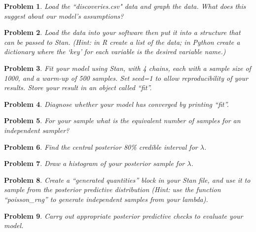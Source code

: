 \documentclass{article}
\newtheorem{problem}{Problem}[section]
\begin{document}
\begin{problem}
Load the ``discoveries.csv" data and graph the data. What does this suggest about our model's assumptions?
\end{problem}

\begin{problem}
Load the data into your software then put it into a structure that can be passed to Stan. (Hint: in R create a list of the data; in Python create a dictionary where the `key' for each variable is the desired variable name.)
\end{problem}

\begin{problem}
Fit your model using Stan, with 4 chains, each with a sample size of 1000, and a warm-up of 500 samples. Set seed=1 to allow reproducibility of your results. Store your result in an object called ``fit''.
\end{problem}

\begin{problem}
Diagnose whether your model has converged by printing ``fit''.
\end{problem}

\begin{problem}
For your sample what is the equivalent number of samples for an independent sampler?
\end{problem}

\begin{problem}
Find the central posterior 80\% credible interval for $\lambda$.
\end{problem}

\begin{problem}
	Draw a histogram of your posterior sample for $\lambda$.
\end{problem}

\begin{problem}
Create a ``generated quantities'' block in your Stan file, and use it to sample from the posterior predictive distribution (Hint: use the function ``poisson\_rng'' to generate independent samples from your lambda).
\end{problem}

\begin{problem}
Carry out appropriate posterior predictive checks to evaluate your model.
\end{problem}
\end{document}
